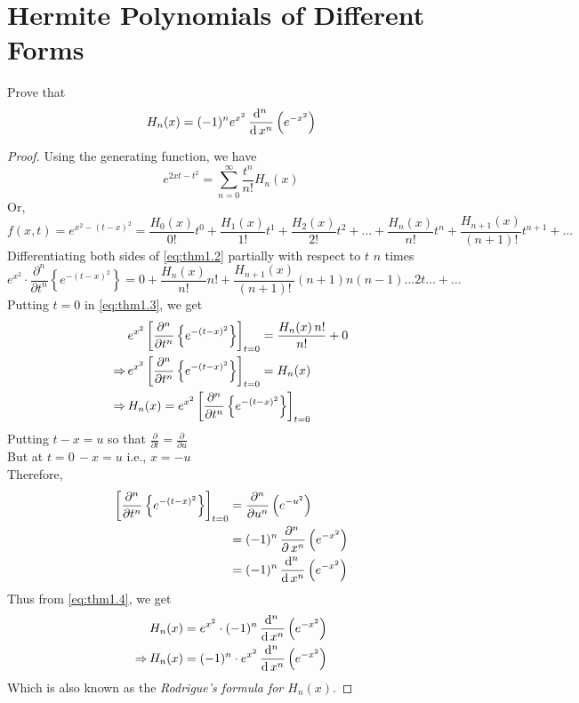 \documentclass[../main-sheet.tex]{subfiles}
\begin{document}
\section{Hermite Polynomials of Different Forms}
\begin{thm}
    Prove that 
    \[
        H_n(x)=(-1)^ne^{x^2}\,\frac{\mathrm{d}^{n}\, }{\mathrm{d}\, x^{n}}\left( e^{-x^2} \right)
    \]
\end{thm}
\begin{proof}
    Using the generating function, we have
    \begin{equation}
        e^{2xt-t^2}=\sum_{n=0}^\infty \frac{t^n}{n!}H_n(x) \label{eq:thm1.1}
    \end{equation}
    Or,
    \begin{equation}
        f(x,t)=e^{x^2-\left( t-x \right)^2}=\frac{H_0(x)}{0!}t^0+\frac{H_1(x)}{1!}t^1+\frac{H_2(x)}{2!}t^2+\dots+\frac{H_n(x)}{n!}t^n+\frac{H_{n+1}(x)}{(n+1)!}t^{n+1}+\dots \label{eq:thm1.2}
    \end{equation}
    Differentiating both sides of \eqref{eq:thm1.2} partially with respect to \( t \) \( n \) times
    \begin{equation}
        e^{x^2}\cdot\frac{\partial^n}{\partial t^n}\left\{ e^{-(t-x)^2}\right\}=0+\frac{H_n(x)}{n!}n!+\frac{H_{n+1}(x)}{(n+1)!}(n+1)n(n-1)\dots2t\dots+\dots \label{eq:thm1.3}
    \end{equation}
    Putting \( t=0 \) in \eqref{eq:thm1.3}, we get
    \begin{align}
        &e^{x^2}\left[ \frac{\partial^n}{\partial t^n}\left\{ e^{-(t-x)^2}\right\} \right]_{t=0}=\frac{H_n(x)\,n!}{n!}+0\notag\\
        \Rightarrow\,&e^{x^2}\left[ \frac{\partial^n}{\partial t^n}\left\{ e^{-(t-x)^2}\right\} \right]_{t=0}=H_n(x)\notag\\
        \Rightarrow\,&H_n(x)=e^{x^2}\left[ \frac{\partial^n}{\partial t^n}\left\{ e^{-(t-x)^2}\right\} \right]_{t=0} \label{eq:thm1.4}
    \end{align}
    Putting \( t-x=u \) so that \( \frac{\partial }{\partial t}=\frac{\partial}{\partial u} \)\\
    But at \( t=0\,-x=u \) i.e., \( x=-u \)\\
    Therefore,
    \begin{align*}
        \left[ \frac{\partial^n}{\partial t^n}\left\{ e^{-(t-x)^2}\right\} \right]_{t=0}&=\frac{\partial^n}{\partial u^n}\left( e^{-u^2} \right)\\
        &=(-1)^n \,\frac{\partial^{n}\, }{\partial\, x^{n}}\left( e^{-x^2} \right)\\
        &=(-1)^n \,\frac{\mathrm{d}^{n}\, }{\mathrm{d}\, x^{n}}\left( e^{-x^2} \right)
    \end{align*}
    Thus from \eqref{eq:thm1.4}, we get
    \begin{align*}
        & H_n(x)=e^{x^2}\cdot(-1)^n \,\frac{\mathrm{d}^{n}\, }{\mathrm{d}\, x^{n}}\left( e^{-x^2} \right)\\
        \Rightarrow\,& H_n(x)=(-1)^n\cdot e^{x^2} \,\frac{\mathrm{d}^{n}\, }{\mathrm{d}\, x^{n}}\left( e^{-x^2} \right)
    \end{align*}
    Which is also known as the \emph{Rodrigue's formula for \( H_n(x) \)}.
\end{proof}
\end{document}
